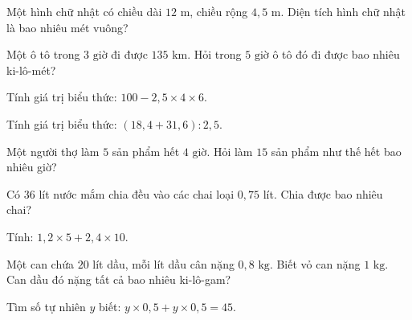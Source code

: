 \begin{ex}
  Một hình chữ nhật có chiều dài $12\text{ m}$, chiều rộng $4{,}5\text{ m}$. Diện tích hình chữ nhật là bao nhiêu mét vuông?
\end{ex}

\begin{ex}
  Một ô tô trong $3\text{ giờ}$ đi được $135\text{ km}$. Hỏi trong $5\text{ giờ}$ ô tô đó đi được bao nhiêu ki-lô-mét?
\end{ex}

\begin{ex}
  Tính giá trị biểu thức: $100 - 2{,}5 \times 4 \times 6$.
\end{ex}

\begin{ex}
  Tính giá trị biểu thức: $(18{,}4 + 31{,}6) : 2{,}5$.
\end{ex}

\begin{ex}
  Một người thợ làm $5$ sản phẩm hết $4\text{ giờ}$. Hỏi làm $15$ sản phẩm như thế hết bao nhiêu giờ?
\end{ex}

\begin{ex}
  Có $36$ lít nước mắm chia đều vào các chai loại $0{,}75$ lít. Chia được bao nhiêu chai?
\end{ex}

\begin{ex}
  Tính: $1{,}2 \times 5 + 2{,}4 \times 10$.
\end{ex}

\begin{ex}
  Một can chứa $20$ lít dầu, mỗi lít dầu cân nặng $0{,}8\text{ kg}$. Biết vỏ can nặng $1\text{ kg}$. Can dầu đó nặng tất cả bao nhiêu ki-lô-gam?
\end{ex}

\begin{ex}
  Tìm số tự nhiên $y$ biết: $y \times 0{,}5 + y \times 0{,}5 = 45$.
\end{ex}


